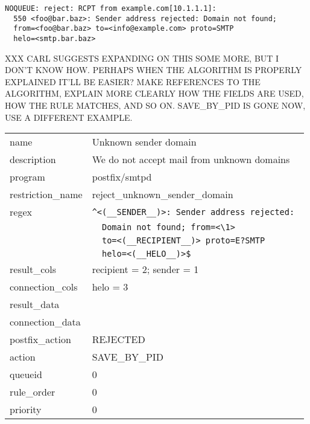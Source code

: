 \documentclass[a4paper,12pt,draft]{article}
\begin{document}
\begin{verbatim}
NOQUEUE: reject: RCPT from example.com[10.1.1.1]: 
  550 <foo@bar.baz>: Sender address rejected: Domain not found;
  from=<foo@bar.baz> to=<info@example.com> proto=SMTP
  helo=<smtp.bar.baz>
\end{verbatim}

XXX CARL SUGGESTS EXPANDING ON THIS SOME MORE, BUT I DON'T KNOW HOW\@.
PERHAPS WHEN THE ALGORITHM IS PROPERLY EXPLAINED IT'LL BE EASIER\@?  MAKE
REFERENCES TO THE ALGORITHM, EXPLAIN MORE CLEARLY HOW THE FIELDS ARE USED,
HOW THE RULE MATCHES, AND SO ON\@.  SAVE\_BY\_PID IS GONE NOW, USE A
DIFFERENT EXAMPLE.

\begin{tabular}[]{ll}

name                & Unknown sender domain                             \\
description         & We do not accept mail from unknown domains        \\
program             & postfix/smtpd                                     \\
restriction\_name   & reject\_unknown\_sender\_domain                   \\
regex               & \verb!^<(__SENDER__)>: Sender address rejected: ! \\
                    & \verb!  Domain not found; from=<\1> !             \\
                    & \verb!  to=<(__RECIPIENT__)> proto=E?SMTP !       \\
                    & \verb!  helo=<(__HELO__)>$!                       \\
result\_cols        & recipient = 2; sender = 1                         \\
connection\_cols    & helo = 3                                          \\
result\_data        &                                                   \\
connection\_data    &                                                   \\
postfix\_action     & REJECTED                                          \\
action              & SAVE\_BY\_PID                                     \\
queueid             & 0                                                 \\
rule\_order         & 0                                                 \\
priority            & 0                                                 \\

\end{tabular}
\end{document}

